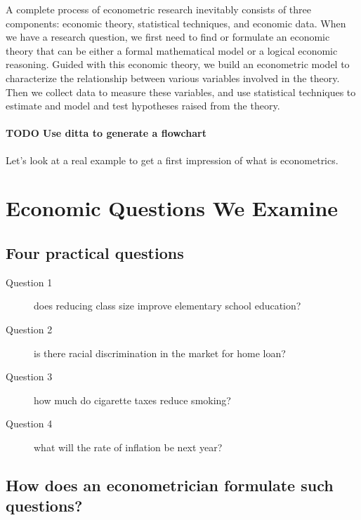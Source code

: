 \documentclass[a4paper,11pt]{article}
\begin{document}
A complete process of econometric research inevitably consists of three
components: economic theory, statistical techniques, and economic
data. When we have a research question, we first need to find or
formulate an economic theory that can be either a formal mathematical
model or a logical economic reasoning. Guided with this economic
theory, we build an econometric model to characterize the relationship
between various variables involved in the theory. Then we collect data
to measure these variables, and use statistical techniques to estimate
and model and test hypotheses raised from the theory. 

\paragraph*{{\bfseries\sffamily TODO} Use ditta to generate a flowchart}
\label{sec:org48298de}

Let's look at a real example to get a first impression of what is
econometrics. 

\section{Economic Questions We Examine}
\label{sec:orgcf9aa98}

\subsection{Four practical questions}
\label{sec:org0ad65fa}

\begin{description}
\item[{Question 1}] does reducing class size improve elementary school education?

\item[{Question 2}] is there racial discrimination in the market for home loan?

\item[{Question 3}] how much do cigarette taxes reduce smoking?

\item[{Question 4}] what will the rate of inflation be next year?
\end{description}


\subsection{How does an econometrician formulate such questions?}
\label{sec:orgfc78e92}
\end{document}
